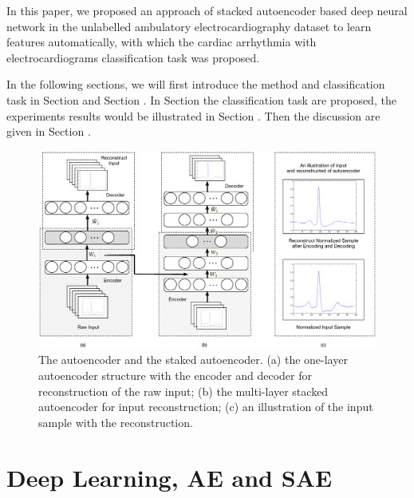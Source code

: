 \documentclass[journal]{IEEEtran}
\begin{document}
In this paper, we proposed an approach of stacked autoencoder based deep neural network in the unlabelled ambulatory electrocardiography dataset to learn features automatically, with which the cardiac arrhythmia with electrocardiograms classification task was proposed. 

In the following sections, we will first introduce the method and classification task in Section  \uppercase\expandafter{}  and Section  \uppercase\expandafter{} . In Section  \uppercase\expandafter{}  the classification task are proposed, the experiments results would be illustrated in Section  \uppercase\expandafter{} . Then the discussion are given in Section  \uppercase\expandafter{} .

\begin{figure}[]
\centering
\includegraphics[width=7 in]{eps/figure2.eps}
\caption{The autoencoder and the staked autoencoder. (a) the one-layer autoencoder structure with the encoder and decoder for reconstruction of the raw input; (b) the multi-layer stacked autoencoder for input reconstruction; (c) an illustration of the input sample with the reconstruction.}
\label{figure1}
\end{figure}

\section{Deep Learning, AE and SAE}
\end{document}
